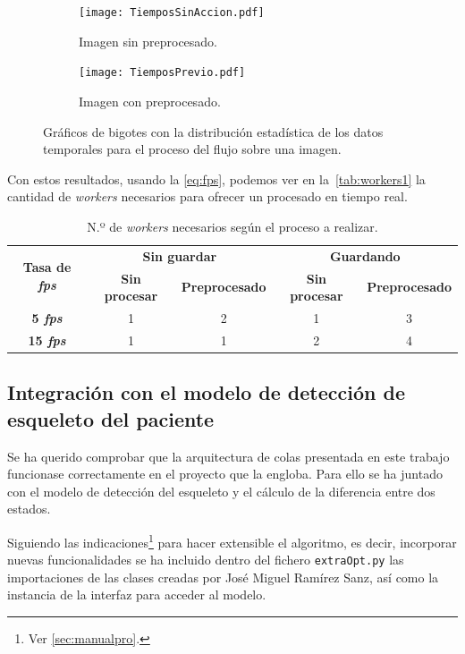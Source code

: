 \begin{figure}[h]
	\begin{subfigure}[b]{\textwidth}
		\texttt{[image: TiemposSinAccion.pdf]}
		\caption{Imagen sin preprocesado.}
	\end{subfigure}
	\begin{subfigure}[b]{\textwidth}
		\texttt{[image: TiemposPrevio.pdf]}
		\caption{Imagen con preprocesado.}
	\end{subfigure}
	\caption{Gráficos de bigotes con la distribución estadística de los datos temporales para el proceso del flujo sobre una imagen.}
	\label{fig:dist2}
\end{figure}

Con estos resultados, usando la \autoref{eq:fps}, podemos ver en la~\autoref{tab:workers1} la cantidad de \textit{workers} necesarios para ofrecer un procesado en tiempo real.

\begin{table}[h]
	\begin{center}
		\begin{tabular}{c  c c c c  }
			\toprule
			\multirow{2}{1.5cm}{\textbf{Tasa de \textit{fps}}}& \multicolumn{2}{c}{\textbf{Sin guardar}} & \multicolumn{2}{c}{\textbf{Guardando}}\\
			& \textbf{Sin procesar} & \textbf{Preprocesado} & \textbf{Sin procesar} & \textbf{Preprocesado}\\
			\otoprule
			\textbf{5 \textit{fps}} & 1 & 2 &1 & 3\\
			\textbf{15 \textit{fps}} & 1 & 1 &2 & 4\\
			\bottomrule
		\end{tabular}
	\end{center}
	\caption{N.º de \textit{workers} necesarios según el proceso a realizar.}
	\label{tab:workers1}
\end{table}


\subsection{Integración con el modelo de detección de esqueleto del paciente}

Se ha querido comprobar que la arquitectura de colas presentada en este trabajo funcionase correctamente en el proyecto que la engloba. Para ello se ha juntado con el modelo de detección del esqueleto y el cálculo de la diferencia entre dos estados.

Siguiendo las indicaciones\footnote{Ver \autoref{sec:manualpro}.} para hacer extensible el algoritmo, es decir, incorporar nuevas funcionalidades se ha incluido dentro del fichero \texttt{extraOpt.py} las importaciones de las clases creadas por José Miguel Ramírez Sanz, así como la instancia de la interfaz para acceder al modelo.

